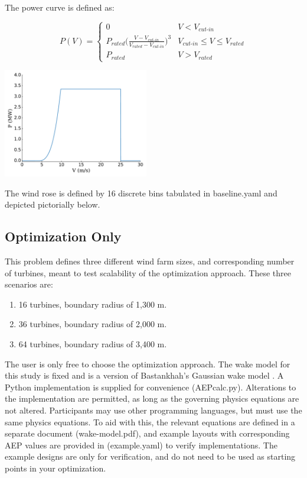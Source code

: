 \documentclass{article}
\begin{document}
The power curve is defined as:   

\begin{minipage}{0.5\textwidth}
\begin{equation*}
P(V) = 
\begin{cases} 
0 & V < V_{\textit{cut-in}} \\
P_{\textit{rated}}\bigg(\frac{V-V_{\textit{cut-in}}}{V_{\textit{rated}}-V_{\textit{cut-in}}}\bigg)^3 & V_{\textit{cut-in}}\leq V \leq V_{\textit{rated}} \\
P_{\textit{rated}} & V > V_{\textit{rated}}
\end{cases}
\label{eq:power}
\end{equation*}
\end{minipage}\qquad
\begin{minipage}{0.5\textwidth}
\includegraphics[width=2.5in]{power_curve}
\end{minipage}


The wind rose is defined by 16 discrete bins tabulated in baseline.yaml and depicted pictorially below.

\subsection{Optimization Only}

This problem defines three different wind farm sizes, and corresponding number of turbines, meant to test scalability of the optimization approach.  These three scenarios are:
\begin{enumerate}
    \item 16 turbines, boundary radius of 1,300 m.
    \item 36 turbines, boundary radius of 2,000 m.
    \item 64 turbines, boundary radius of 3,400 m.
\end{enumerate}

The user is only free to choose the optimization approach.  The wake model for this study is fixed and is a version of Bastankhah's Gaussian wake model \cite{Thomas2018, Bastankhah2014, Bastankhah2016}.  A Python implementation is supplied for convenience (AEPcalc.py). Alterations to the implementation are permitted, as long as the governing physics equations are not altered.  Participants may use other programming languages, but must use the same physics equations.  To aid with this, the relevant equations are defined in a separate document (wake-model.pdf), and example layouts with corresponding AEP values are provided in (example.yaml) to verify implementations.  The example designs are only for verification, and do not need to be used as starting points in your optimization.  
\end{document}
